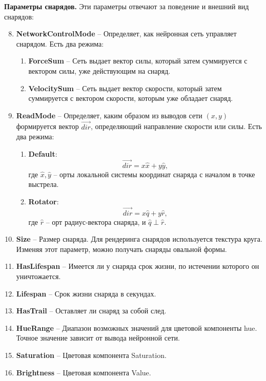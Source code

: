 \textbf{Параметры снарядов.} Эти параметры отвечают за поведение и внешний вид снарядов:
\begin{enumerate}
    \setcounter{enumi}{7}
    \item {\small \textbf{NetworkControlMode}} -- Определяет, как нейронная сеть управляет снарядом. Есть два режима:
    \begin{enumerate}[label=\textbullet]
        \item {\small \textbf{ForceSum}} -- Сеть выдает вектор силы, который затем суммируется с вектором силы, уже действующим на снаряд.
        \item {\small \textbf{VelocitySum}} -- Сеть выдает вектор скорости, который затем суммируется с вектором скорости, которым уже обладает снаряд.
    \end{enumerate}
    \item {\small \textbf{ReadMode}} -- Определяет, каким образом из выводов сети $(x, y)$ формируется вектор $\overrightarrow{dir}$, определяющий направление скорости или силы. Есть два режима:
    \begin{enumerate}[label=\textbullet]
        \item {\small \textbf{Default}}: \[ \overrightarrow{dir}=x\hat{x}+y\hat{y}, \]
        где $\hat{x}, \hat{y}$ -- орты локальной системы координат снаряда с началом в точке выстрела.

        \item {\small \textbf{Rotator}}: \[ \overrightarrow{dir}=x\hat{q}+y\hat{r}, \]
        где $\hat{r}$ -- орт радиус-вектора снаряда, и $\hat{q} \perp \hat{r}$.

    \end{enumerate}
    \item {\small \textbf{Size}} -- Размер снаряда. Для рендеринга снарядов используется текстура круга. Изменяя этот параметр, можно получать снаряды овальной формы.
    \item {\small \textbf{HasLifespan}} -- Имеется ли у снаряда срок жизни, по истечении которого он уничтожается.
    \item {\small \textbf{Lifespan}} -- Срок жизни снаряда в секундах.
    \item {\small \textbf{HasTrail}} -- Оставляет ли снаряд за собой след.
    \item {\small \textbf{HueRange}} -- Диапазон возможных значений для цветовой компоненты hue. Точное значение зависит от вывода нейронной сети.
    \item {\small \textbf{Saturation}} -- Цветовая компонента Saturation.
    \item {\small \textbf{Brightness}} -- Цветовая компонента Value.
\end{enumerate}

